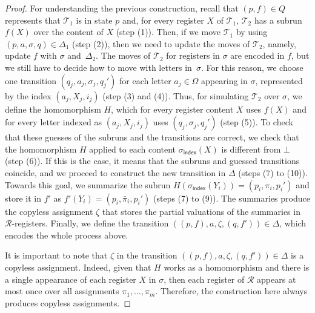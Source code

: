 \documentclass[
a4paper
]{article}
\theoremstyle{plain}
\theoremstyle{definition}
\theoremstyle{remark}
\newcommand{\Reg}{\mathcal{R}}
\newcommand{\nsst}{\mathcal{T}}
\newcommand{\indx}{\operatorname{index}}
\newcommand{\indxsigma}{\sigma_{\indx}}
\renewcommand{\operatorname}[1]{\textsf{#1}}
\begin{document}
\begin{proof}
For understanding the previous construction, recall that $(p, f) \in Q$ represents that $\nsst_1$ is in state $p$ and, for every register $X$ of $\nsst_1$,  $\nsst_2$ has a subrun $f(X)$ over the content of $X$ (step (1)). Then, if we move $\nsst_1$ by using $(p,a,\sigma, q) \in \Delta_1$ (step (2)), then we need to update the moves of $\nsst_2$, namely, update $f$ with $\sigma$ and~$\Delta_2$. The moves of $\nsst_2$ for registers in $\sigma$ are encoded in $f$, but we still have to decide how to move with letters in~$\sigma$. For this reason, we choose one transition $(q_j, a_j, \sigma_j, q_j')$ for each letter $a_j \in \Omega$ appearing in $\sigma$, represented by the index $(a_j, X_j, i_j)$ (step (3) and (4)). Thus, for simulating $\nsst_2$ over $\sigma$, we define the homomorphism $H$, which for every register content $X$ uses $f(X)$ and for every letter indexed as $(a_j, X_j, i_j)$ uses $(q_j, \sigma_j, q_j')$ (step (5)). To check that these guesses of the subruns and the transitions are correct, we check that the homomorphism $H$ applied to each content $\indxsigma(X)$ is different from $\bot$ (step (6)). If this is the case, it means that the subruns and guessed transitions coincide, and we proceed to construct the new transition in $\Delta$ (steps (7) to (10)). Towards this goal, we summarize the subrun $H(\indxsigma(Y_i)) = (p_i, \pi_i, p_i')$ and store it in $f'$ as $f'(Y_i) = (p_i, \bar{\pi}_i, p_i')$ (steps (7) to (9)). The summaries produce the copyless assignment $\zeta$ that stores the partial valuations of the summaries in $\Reg$-registers. Finally, we define the transition $((p,f), a, \zeta, (q, f')) \in \Delta$, which encodes the whole process above.

It is important to note that $\zeta$ in the transition $((p,f), a, \zeta, (q, f')) \in \Delta$ is a copyless assignment. Indeed, given that $H$ works as a homomorphism and there is a single appearance of each register $X$ in $\sigma$, then each register of $\Reg$ appears at most once over all assignments $\pi_1, \ldots, \pi_m$. Therefore, the construction here always produces copyless assignments.


\end{proof}
\end{document}
